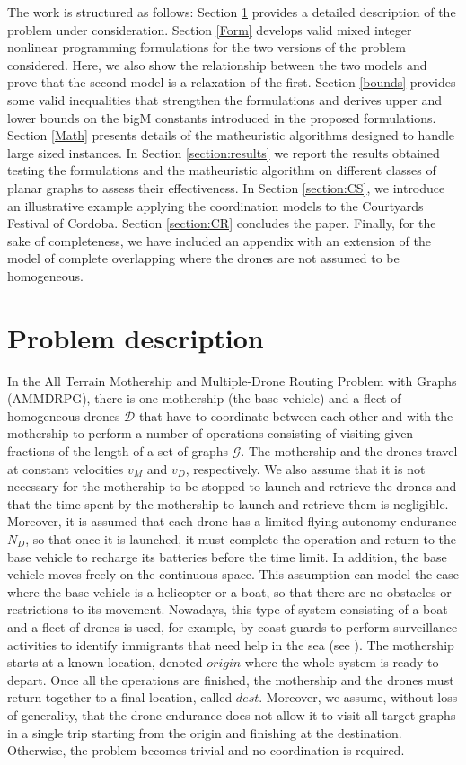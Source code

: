 \documentclass[10pt,a4paper]{elsarticle}
\def\AMD{{\sf AMMDRPG\xspace}}
\newcommand{\EN}[1]{{\color{black}#1}}
\begin{document}
\noindent
The work is structured as follows: Section \ref{section:desc} provides a detailed description of the problem under consideration. Section \ref{Form}  develops valid mixed integer nonlinear programming formulations for the two versions of the \EN{problem considered}. Here, we also show the relationship between the two models and prove that the second model is a relaxation of the first. Section \ref{bounds} provides some valid inequalities that strengthen the formulations and derives upper and lower bounds on the bigM constants introduced in the proposed formulations. Section \ref{Math} presents details of the matheuristic algorithms designed to handle large sized instances. In Section \ref{section:results} we report the results obtained testing the formulations and the matheuristic algorithm on different classes of planar graphs to assess \EN{their} effectiveness. In Section \ref{section:CS}, we introduce an illustrative example applying the coordination models to the Courtyards Festival of Cordoba. Section \ref{section:CR} concludes the paper. Finally, for the sake of completeness, we have included an appendix with an extension of the model of complete overlapping where the drones are not assumed to be homogeneous. 
\section{Problem description}\label{section:desc}
\noindent
In the All Terrain Mothership and \EN{Multiple-Drone} Routing Problem with Graphs (\AMD), there is one mothership (the base vehicle) and a fleet of homogeneous drones $\mathcal D$ that have to coordinate \EN{between each other} and with the mothership to perform a number of operations consisting \EN{of} visiting given fractions of the length of a set of graphs $\mathcal G$. The mothership and the drones travel at constant velocities $v_M$ and $v_D$, respectively. We also assume that \EN{it} is not \EN{necessary for} the mothership to be stopped to launch and retrieve the drones and that the time spent by the mothership to launch and retrieve them is negligible. Moreover, it is assumed that each drone has a limited flying autonomy endurance $N_D$, so that once it is launched, it must complete the operation and return to the base vehicle to recharge \EN{its} batteries before the time limit. In addition, the base vehicle moves freely on the continuous space. This assumption can model the case where the base vehicle is a helicopter or a boat, so that there are no obstacles or restrictions \EN{to} its movement. Nowadays, this type of system consisting \EN{of} a boat and a fleet of drones \EN{is} used, for example, by coast guards to perform surveillance activities to identify immigrants that need help in the sea (see \cite{altigator2015}). The mothership starts at a known location, denoted $origin$ where the whole system is ready to depart. Once all the operations are finished, the mothership and the drones must return together to a final location, called $dest$. Moreover, we assume, without loss of generality, that the drone endurance does not allow \EN{it} to visit all target graphs in a single trip starting from the origin and finishing at the destination. Otherwise, the problem becomes trivial and no coordination is required.
\end{document}
